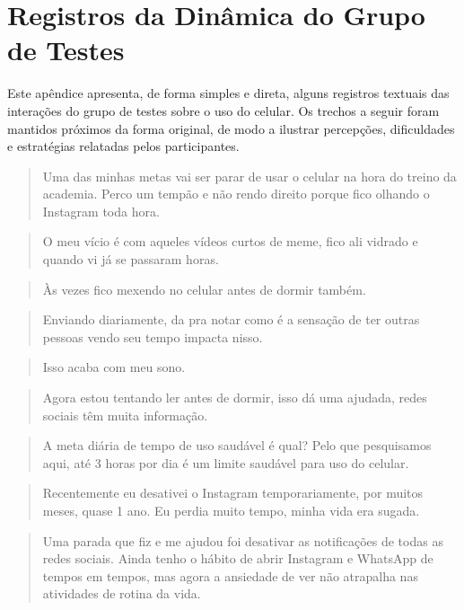 \chapter{Registros da Dinâmica do Grupo de Testes}

Este apêndice apresenta, de forma simples e direta, alguns registros textuais das interações do grupo de testes sobre o uso do celular. Os trechos a seguir foram mantidos próximos da forma original, de modo a ilustrar percepções, dificuldades e estratégias relatadas pelos participantes.

\begin{quote}
Uma das minhas metas vai ser parar de usar o celular na hora do treino da academia. Perco um tempão e não rendo direito porque fico olhando o Instagram toda hora.
\end{quote}

\begin{quote}
O meu vício é com aqueles vídeos curtos de meme, fico ali vidrado e quando vi já se passaram horas.
\end{quote}

\begin{quote}
Às vezes fico mexendo no celular antes de dormir também.
\end{quote}

\begin{quote}
Enviando diariamente, da pra notar como é a sensação de ter outras pessoas vendo seu tempo impacta nisso.
\end{quote}

\begin{quote}
Isso acaba com meu sono.
\end{quote}

\begin{quote}
Agora estou tentando ler antes de dormir, isso dá uma ajudada, redes sociais têm muita informação.
\end{quote}

\begin{quote}
A meta diária de tempo de uso saudável é qual? Pelo que pesquisamos aqui, até 3 horas por dia é um limite saudável para uso do celular.
\end{quote}

\begin{quote}
Recentemente eu desativei o Instagram temporariamente, por muitos meses, quase 1 ano. Eu perdia muito tempo, minha vida era sugada.
\end{quote}

\begin{quote}
Uma parada que fiz e me ajudou foi desativar as notificações de todas as redes sociais. Ainda tenho o hábito de abrir Instagram e WhatsApp de tempos em tempos, mas agora a ansiedade de ver não atrapalha nas atividades de rotina da vida.
\end{quote}

